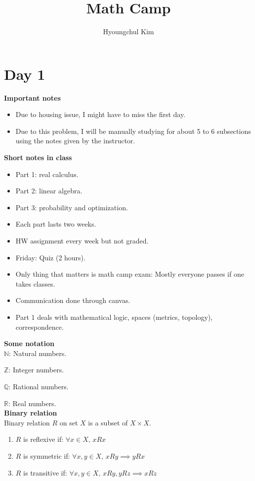 \documentclass[a4paper]{article}
\title{Math Camp}
\author{Hyoungchul Kim}
\newcommand{\R}{\mathbb{R}}
\newcommand{\Z}{\mathbb{Z}}
\newcommand{\N}{\mathbb{N}}
\newcommand{\Q}{\mathbb{Q}}
\begin{document}
\maketitle
	

\section{Day 1}

\textbf{Important notes}

\begin{itemize}
	\item Due to housing issue, I might have to miss the first day.
	\item Due to this problem, I will be manually studying for about 5 to 6 subsections using the notes given by the instructor.
\end{itemize}


\noindent \textbf{Short notes in class}

\begin{itemize}
	\item Part 1: real calculus.
	\item Part 2: linear algebra.
	\item Part 3: probability and optimization.
	\item Each part lasts two weeks.
	\item HW assignment every week but not graded.
	\item Friday: Quiz (2 hours).
	\item Only thing that matters is math camp exam: Mostly everyone passes if one takes classes.
	\item Communication done through canvas.
	\item Part 1 deals with mathematical logic, spaces (metrics, topology), correspondence.
\end{itemize}

\textbf{Some notation}\\

$\N$: Natural numbers.

$\Z$: Integer numbers.

$\Q$: Rational numbers.

$\R$: Real numbers.\\

\textbf{Binary relation}\\

Binary relation $R$ on set  $X$ is a subset of  $X\times X$.

\begin{enumerate}
	\item $R$ is reflexive if:  $\forall x \in X, \, xRx$
	\item $R$ is symmetric if:  $\forall x, y \in X, \, xRy \implies yRx$
	\item $R$ is transitive if:  $\forall x, y \in X, \, xRy, yRz \implies xRz$
\end{enumerate}
\end{document}
